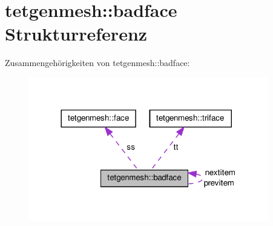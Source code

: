 \hypertarget{structtetgenmesh_1_1badface}{\section{tetgenmesh\-:\-:badface Strukturreferenz}
\label{structtetgenmesh_1_1badface}
}


Zusammengehörigkeiten von tetgenmesh\-:\-:badface\-:\nopagebreak
\begin{figure}[H]
\begin{center}
\leavevmode
\includegraphics[width=296pt]{structtetgenmesh_1_1badface__coll__graph}
\end{center}
\end{figure}
